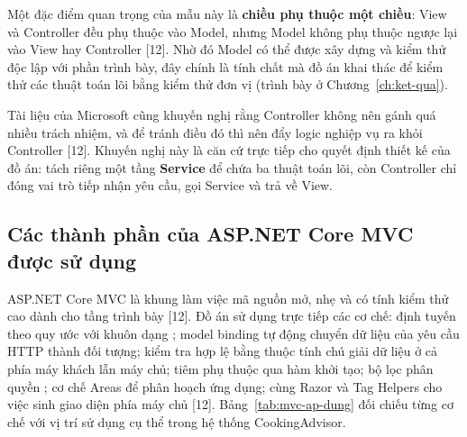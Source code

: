 Một đặc điểm quan trọng của mẫu này là \textbf{chiều phụ thuộc một chiều}: View
và Controller đều phụ thuộc vào Model, nhưng Model không phụ thuộc ngược lại vào
View hay Controller [12]. Nhờ đó Model có thể được xây dựng và kiểm thử độc lập
với phần trình bày, đây chính là tính chất mà đồ án khai thác để kiểm thử các
thuật toán lõi bằng kiểm thử đơn vị (trình bày ở Chương~\ref{ch:ket-qua}).

Tài liệu của Microsoft cũng khuyến nghị rằng Controller không nên gánh quá nhiều
trách nhiệm, và để tránh điều đó thì nên đẩy logic nghiệp vụ ra khỏi Controller
[12]. Khuyến nghị này là căn cứ trực tiếp cho quyết định thiết kế của đồ án: tách
riêng một tầng \textbf{Service} để chứa ba thuật toán lõi, còn Controller chỉ
đóng vai trò tiếp nhận yêu cầu, gọi Service và trả về View.

\subsection{Các thành phần của ASP.NET Core MVC được sử dụng}

ASP.NET Core MVC là khung làm việc mã nguồn mở, nhẹ và có tính kiểm thử cao dành
cho tầng trình bày [12]. Đồ án sử dụng trực tiếp các cơ chế: định tuyến theo quy
ước với khuôn dạng ; model binding tự
động chuyển dữ liệu của yêu cầu HTTP thành đối tượng; kiểm tra hợp lệ bằng thuộc
tính chú giải dữ liệu ở cả phía máy khách lẫn máy chủ; tiêm phụ thuộc qua hàm
khởi tạo; bộ lọc phân quyền \code{[Authorize]}; cơ chế Areas để phân hoạch ứng
dụng; cùng Razor và Tag Helpers cho việc sinh giao diện phía máy chủ [12].
Bảng~\ref{tab:mvc-ap-dung} đối chiếu từng cơ chế với vị trí sử dụng cụ thể trong
hệ thống CookingAdvisor.

